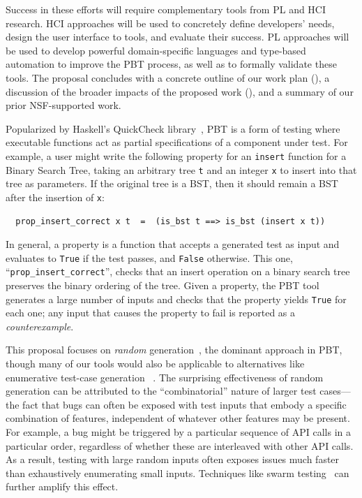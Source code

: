 Success in these efforts will require complementary tools from PL
and HCI research. HCI approaches will be used to concretely define developers' needs,
design the user interface to tools, and evaluate their success. PL approaches
will be used to develop powerful domain-specific languages and type-based automation
to improve the PBT process, as well as to formally validate these
tools. The proposal concludes with a concrete outline of our work plan
(), a discussion of the broader impacts of the
proposed work (), and a summary of our
prior NSF-supported work.

%
Popularized by Haskell's QuickCheck library~\cite{hughes2007quickcheck},
PBT is a form of testing where
executable functions act as partial
specifications of a component under test. For example, a user might
write the following property for an \lstinline{insert}
function for a Binary Search Tree, taking an arbitrary tree \texttt{t}
and an integer
\texttt{x} to insert into that tree as parameters. If the original tree
is a BST, then it should remain
a BST after the insertion of \texttt{x}:
\begin{lstlisting}
  prop_insert_correct x t  =  (is_bst t ==> is_bst (insert x t))
\end{lstlisting}
In general, a property is a function that
accepts a generated
test as input and evaluates to \lstinline{True} if the test passes, and
\lstinline{False} otherwise.  This one, ``\verb|prop_insert_correct|'',
checks that an insert operation on a binary search tree preserves the
binary ordering of the tree.
Given a property, the PBT tool generates a
large number of inputs and
checks that the property yields \lstinline{True} for each one; any input
that causes the property to fail is reported as a {\em counterexample}.

This proposal focuses on {\em random}
generation~\cite{hamlet1994random}, the dominant approach in PBT,
though many of our tools would
also be applicable to alternatives like enumerative test-case
generation~\cite{DBLP:conf/haskell/RuncimanNL08, leancheck}
.
The surprising effectiveness of random generation can be attributed to the
``combinatorial'' nature of larger test cases---the fact that bugs can often be
exposed with test inputs that embody a specific combination of features,
independent of whatever other features may be present. For example,
a bug might be triggered by a particular sequence of API calls in a
particular order,
regardless of whether these are
interleaved with other API calls. As a result, testing with large random
inputs often exposes issues much faster than exhaustively enumerating
small inputs.  Techniques like swarm testing~\cite{groce2012swarm} can
further amplify this effect.

